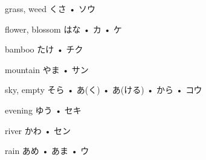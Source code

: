 



\setcounter{cardnum}{33}

		{grass, weed}
		{くさ • ソウ}
		{}{}
		{}{}
		{}{}
		{}{}
		{}{}

		{flower, blossom}
		{はな • カ • ケ}
		{}{}
		{}{}
		{}{}
		{}{}
		{}{}

		{bamboo}
		{たけ • チク}
		{}{}
		{}{}
		{}{}
		{}{}
		{}{}

		{mountain}
		{やま • サン}
		{}{}
		{}{}
		{}{}
		{}{}
		{}{}

		{sky, empty}
		{そら • あ(く) • あ(ける) • から • コウ}
		{}{}
		{}{}
		{}{}
		{}{}
		{}{}

		{evening}
		{ゆう • セキ}
		{}{}
		{}{}
		{}{}
		{}{}
		{}{}

		{river}
		{かわ • セン}
		{}{}
		{}{}
		{}{}
		{}{}
		{}{}

		{rain}
		{あめ • あま • ウ}
		{}{}
		{}{}
		{}{}
		{}{}
		{}{}

